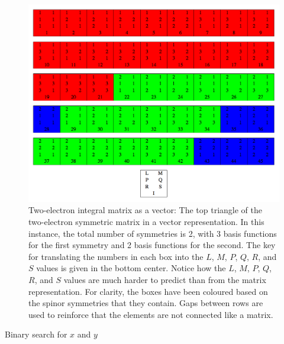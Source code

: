 \begin{figure}[h!]
\includegraphics[width=1\textwidth]{Figures/eint2_vec.png}
\caption[Two-electron integral matrix as a vector]
{Two-electron integral matrix as a vector: The top triangle of the two-electron symmetric matrix in a vector representation. In this instance, the total number of symmetries is 2, with 3 basis functions for the first symmetry and 2 basis functions for the second. The key for translating the numbers in each box into the $L$, $M$, $P$, $Q$, $R$, and $S$ values is given in the bottom center. Notice how the $L$, $M$, $P$, $Q$, $R$, and $S$ values are much harder to predict than from the matrix representation. For clarity, the boxes have been coloured based on the spinor symmetries that they contain. Gaps between rows are used to reinforce that the elements are not connected like a matrix.}
\label{fig:eint2vec}
\end{figure}


\begin{algorithm}[h!]
\caption{Binary search for $x$ and $y$}
\label{bsxy}
\begin{algorithmic}

\ENDIF


		\ENDIF
	\ENDWHILE
\ENDIF

\end{algorithmic}
\end{algorithm}

